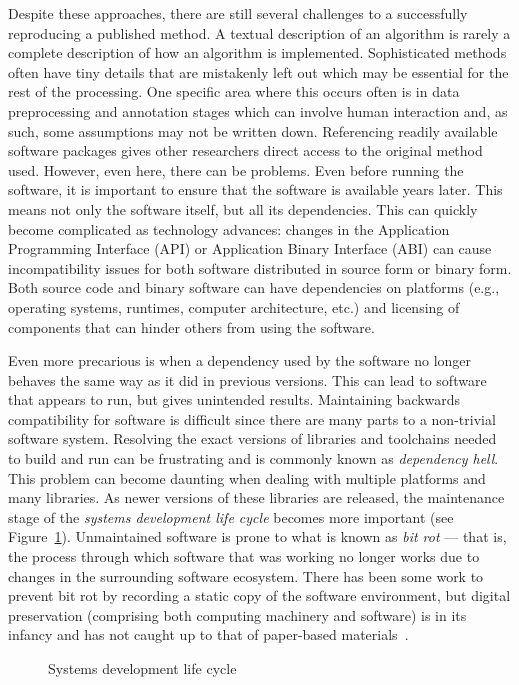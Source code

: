 Despite these approaches, there are still several challenges to a successfully
reproducing a published method.
{ %
	A textual description of an algorithm is rarely a complete description of
	how an algorithm is implemented. Sophisticated methods often have tiny details
	that are mistakenly left out which may be essential for the rest of the
	processing. One specific area where this occurs often is
	in data preprocessing and annotation stages which can
	involve human interaction and, as such, some assumptions
	may not be written down.
}
{ %
	Referencing readily available software packages gives
	other researchers direct access to the original method
	used. However, even here, there can be problems.
	Even before running the software, it is important to
	ensure that the
	software is available years later. This means not only the software itself, but
	all its dependencies. This can quickly become complicated as technology
	advances: changes in the Application Programming Interface (API) or Application
	Binary Interface (ABI) can cause incompatibility issues for both
	software distributed in source form or
	binary form. Both source code and binary software can have
	dependencies on platforms (e.g., operating systems,
	runtimes, computer architecture, etc.) and licensing of
	components that can hinder others from using the software.
}

{ %
	Even more precarious is when a dependency used by the
	software no longer behaves the same way as it did in
	previous versions. This can lead to software that appears
	to run, but gives unintended results. Maintaining
	backwards compatibility for software is difficult since
	there are many parts to a non-trivial software system.
	Resolving the exact versions of libraries and toolchains
	needed to build and run can be frustrating and is commonly
	known as \emph{dependency hell}. This problem can become
	daunting when dealing with multiple platforms and many
	libraries. As newer versions of these libraries are
	released, the maintenance stage of the \emph{systems
	development life cycle} becomes more important (see Figure~\ref{fig:sdlc}).
	Unmaintained software is prone to what is known as
	\emph{bit rot} --- that is, the process through which
	software that was working no longer works due to changes
	in the surrounding software ecosystem.
	There has been some work to prevent bit rot by recording a
	static copy of the software environment, but digital
	preservation (comprising both computing machinery and
	software) is in its infancy and has not caught up to that
	of paper-based materials~\cite{Owens2013,Thain2015,Meng2015}.
}
\begin{figure}
\centering

\caption{Systems development life cycle}\label{fig:sdlc}
\end{figure}


